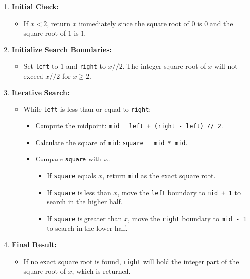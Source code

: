 \begin{enumerate}
    \item \textbf{Initial Check:}
    \begin{itemize}
        \item If \(x < 2\), return \(x\) immediately since the square root of \(0\) is \(0\) and the square root of \(1\) is \(1\).
    \end{itemize}
    
    \item \textbf{Initialize Search Boundaries:}
    \begin{itemize}
        \item Set \texttt{left} to \(1\) and \texttt{right} to \(x // 2\). The integer square root of \(x\) will not exceed \(x // 2\) for \(x \geq 2\).
    \end{itemize}
    
    \item \textbf{Iterative Search:}
    \begin{itemize}
        \item While \texttt{left} is less than or equal to \texttt{right}:
        \begin{itemize}
            \item Compute the midpoint: \texttt{mid} = \texttt{left + (right - left) // 2}.
            \item Calculate the square of \texttt{mid}: \texttt{square} = \texttt{mid * mid}.
            \item Compare \texttt{square} with \(x\):
            \begin{itemize}
                \item If \texttt{square} equals \(x\), return \texttt{mid} as the exact square root.
                \item If \texttt{square} is less than \(x\), move the \texttt{left} boundary to \texttt{mid + 1} to search in the higher half.
                \item If \texttt{square} is greater than \(x\), move the \texttt{right} boundary to \texttt{mid - 1} to search in the lower half.
            \end{itemize}
        \end{itemize}
    \end{itemize}
    
    \item \textbf{Final Result:}
    \begin{itemize}
        \item If no exact square root is found, \texttt{right} will hold the integer part of the square root of \(x\), which is returned.
    \end{itemize}
\end{enumerate}

